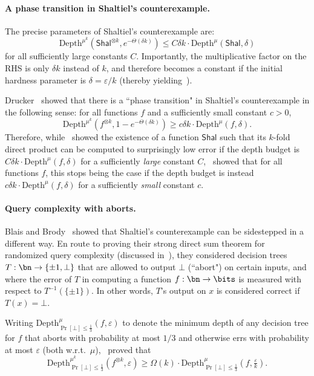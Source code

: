 \documentclass[11pt]{article}
\begin{document}
\paragraph{A phase transition in Shaltiel's counterexample.} 
The precise parameters of Shaltiel's counterexample are:
\[ 
\mathrm{Depth}^{\mu^k}(\mathsf{Shal}^{\otimes k},e^{-\Theta(\delta k)}) \le C\delta k \cdot \mathrm{Depth}^{\mu}(\mathsf{Shal},\delta)
\] 
for all sufficiently large constants $C$. Importantly, the multiplicative factor on the RHS is only $\delta k$ instead of $k$, and therefore becomes a constant if the initial hardness parameter is $\delta = \varepsilon/k$ (thereby yielding~).    


Drucker~\cite{Dru12} showed that there is a ``phase transition" in Shaltiel’s counterexample in the following sense: for all functions $f$ and a sufficiently small constant $c > 0$, 
\begin{equation}
\mathrm{Depth}^{\mu^k}(f^{\otimes k},1-e^{-\Theta(\delta k)}) \ge c\delta k \cdot \mathrm{Depth}^{\mu}(f,\delta).
\label{eq:drucker}
\end{equation}
Therefore, while~\cite{Sha04} showed the existence of a function $\mathsf{Shal}$ such that its $k$-fold direct product can be computed to surprisingly low error if the depth budget is $C\delta k\cdot \mathrm{Depth}^{\mu}(f,\delta)$ for a sufficiently {\sl large} constant $C$,~\cite{Dru12} showed that for all functions $f$, this stops being the case if the depth budget is instead $c\delta k\cdot \mathrm{Depth}^{\mu}(f,\delta)$ for a sufficiently {\sl small} constant $c$.


\paragraph{Query complexity with aborts.} Blais and Brody~\cite{BB19} showed that Shaltiel's counterexample can be sidestepped in a different way. En route to proving their strong direct sum theorem for randomized query complexity (discussed in~), they considered decision trees $T: \bn \to \{\pm 1,\bot\}$ that are allowed to output $\bot$ (``abort") on certain inputs, and where the error of $T$ in computing a function $f: \bn \to \bits$ is measured with respect to $T^{-1}(\{\pm 1\})$. In other words, $T$’s output on $x$ is considered correct if $T(x) = \bot$. 

Writing $\mathrm{Depth}^{\mu}_{\Pr[\bot]\le\frac1{3}}(f,\varepsilon)$ to denote the minimum depth of any decision tree for $f$ that aborts with probability at most $1/3$ and otherwise errs with probability at most $\varepsilon$ (both w.r.t.~$\mu$),~\cite{BB19} proved that 
\begin{equation}
\mathrm{Depth}^{\mu^k}_{\Pr[\bot]\le\frac1{3}}(f^{\otimes k},\varepsilon) \ge \Omega(k) \cdot \mathrm{Depth}^{\mu}_{\Pr[\bot]\le\frac1{3}}(f,\tfrac{\varepsilon}{k}).
\label{eq:blais brody}
\end{equation}
\end{document}
